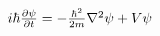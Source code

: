 \documentclass[preview]{standalone}
\begin{document}
$
i \hbar {\partial \psi \over \partial t} = - {\hbar^2 \over 2 m} \nabla^2 \psi + V \psi
$
\end{document}
